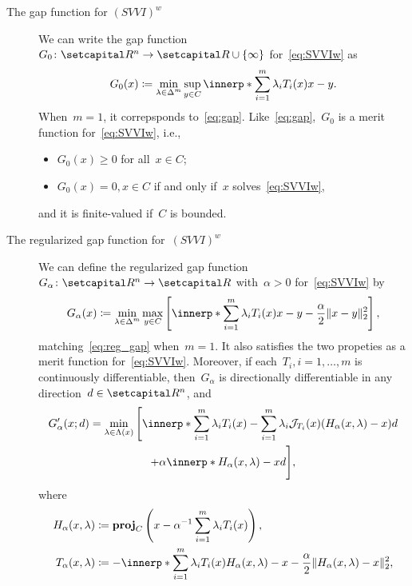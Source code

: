 \documentclass[../../main]{subfiles}
\begin{document}
\begin{example} \label{ex:merit_MO}
    \begin{description}
        \item[The gap function for $(SVVI)^w$~\cite{Charitha2010,Li2010}]
            We can write the gap function~$G_0 \colon \setR^n \to \setR \cup \set{\infty}$ for~\cref{eq:SVVIw} as
            \[
                G_0(x) \coloneqq \min_{\lambda \in \simplex^m} \sup_{y \in C} \innerp*{\sum_{i = 1}^{m} \lambda_i T_i(x)}{x - y}
            .\] 
            When~$m = 1$, it correpsponds to~\cref{eq:gap}.
            Like~\cref{eq:gap},~$G_0$ is a merit function for~\cref{eq:SVVIw}, i.e.,
            \begin{itemize}
                \item $G_0(x) \ge 0$ for all~$x \in C$;
                \item $G_0(x) = 0, x \in C$ if and only if~$x$ solves~\cref{eq:SVVIw},
            \end{itemize}
            and it is finite-valued if~$C$ is bounded.
        \item[The regularized gap function for~$(SVVI)^w$~\cite{Charitha2010}]
            We can define the regularized gap function~$G_\alpha \colon \setR^n \to \setR$ with~$\alpha > 0$ for~\cref{eq:SVVIw} by
            \[
                G_\alpha(x) \coloneqq \min_{\lambda \in \simplex^m} \max_{y \in C} \left[ \innerp*{\sum_{i = 1}^{m} \lambda_i T_i(x)}{x - y} - \frac{\alpha}{2} \norm{x - y}_2^2 \right] 
            ,\] 
            matching~\cref{eq:reg_gap} when~$m = 1$.
            It also satisfies the two propeties as a merit function for~\cref{eq:SVVIw}.
            Moreover, if each~$T_i, i = 1, \dots, m$ is continuously differentiable, then~$G_\alpha$ is directionally differentiable in any direction~$d \in \setR^n$, and
            \begin{multline}
                G_\alpha'(x;d) = \min_{\lambda \in \Lambda(x)} \Bigg[ \innerp*{\sum_{i = 1}^{m} \lambda_i T_i(x) - \sum_{i = 1}^{m} \lambda_i \jdv{T_i}{x} (H_\alpha(x, \lambda) - x)}{d} \\
                + \alpha \innerp*{H_\alpha(x, \lambda) - x}{d} \Bigg] 
            ,\end{multline}
            where
            \begin{align}
                H_\alpha(x, \lambda) &\coloneqq \proj_C\left( x - \alpha^{-1} \sum_{i = 1}^{m} \lambda_i T_i(x) \right), \\
                T_\alpha(x, \lambda) &\coloneqq - \innerp*{\sum_{i = 1}^{m} \lambda_i T_i(x)}{H_\alpha(x, \lambda) - x} - \frac{\alpha}{2} \norm{H_\alpha(x, \lambda) - x}_2^2, \\

\end{align}
\end{description}
\end{example}
\end{document}
